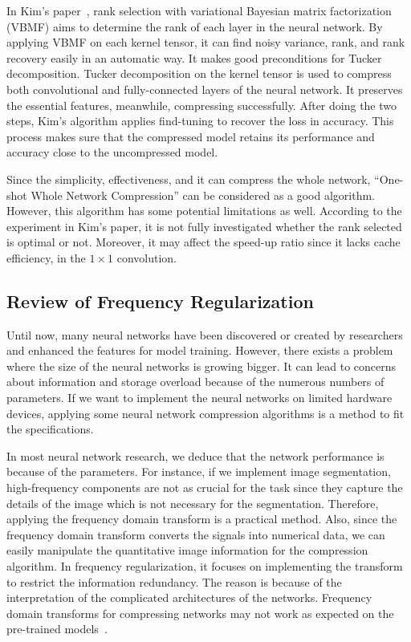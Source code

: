 \documentclass{article}
\begin{document}
In Kim’s paper~\cite{kim2016compression}, rank selection with variational Bayesian matrix factorization (VBMF) aims to determine the rank of each layer in the neural network. By applying VBMF on each kernel tensor, it can find noisy variance, rank, and rank recovery easily in an automatic way. It makes good preconditions for Tucker decomposition. Tucker decomposition on the kernel tensor is used to compress both convolutional and fully-connected layers of the neural network. It preserves the essential features, meanwhile, compressing successfully. After doing the two steps, Kim’s algorithm applies find-tuning to recover the loss in accuracy. This process makes sure that the compressed model retains its performance and accuracy close to the uncompressed model.

Since the simplicity, effectiveness, and it can compress the whole network, “One-shot Whole Network Compression” can be considered as a good algorithm. However, this algorithm has some potential limitations as well. According to the experiment in Kim’s paper, it is not fully investigated whether the rank selected is optimal or not. Moreover, it may affect the speed-up ratio since it lacks cache efficiency, in the $1 \times 1$ convolution.

\subsection{Review of Frequency Regularization}

Until now, many neural networks have been discovered or created by researchers and enhanced the features for model training. However, there exists a problem where the size of the neural networks is growing bigger. It can lead to concerns about information and storage overload because of the numerous numbers of parameters. If we want to implement the neural networks on limited hardware devices, applying some neural network compression algorithms is a method to fit the specifications. 

In most neural network research, we deduce that the network performance is because of the parameters. For instance, if we implement image segmentation, high-frequency components are not as crucial for the task since they capture the details of the image which is not necessary for the segmentation. Therefore, applying the frequency domain transform is a practical method. Also, since the frequency domain transform converts the signals into numerical data, we can easily manipulate the quantitative image information for the compression algorithm. In frequency regularization, it focuses on implementing the transform to restrict the information redundancy. The reason is because of the interpretation of the complicated architectures of the networks. Frequency domain transforms for compressing networks may not work as expected on the pre-trained models~\cite{zhao2023frequency}. 
\end{document}
